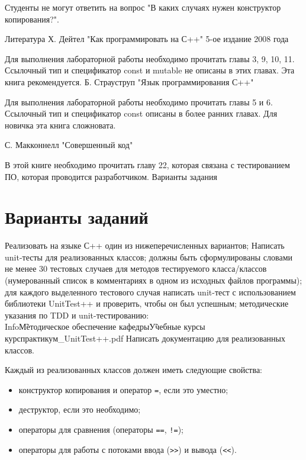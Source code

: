 \documentclass[a4paper,12pt]{article}
\begin{document}
Студенты не могут ответить на вопрос "В каких случаях нужен конструктор копирования?". 

Литература
Х. Дейтел "Как программировать на С++" 5-ое издание 2008 года

Для выполнения лабораторной работы необходимо прочитать главы 3, 9, 10, 11. Ссылочный тип и спецификатор const и mutable не описаны в этих главах. Эта книга рекомендуется.
Б. Страуструп "Язык программирования С++"

Для выполнения лабораторной работы необходимо прочитать главы 5 и 6. Ссылочный тип и спецификатор const описаны в более ранних главах. Для новичка эта книга сложновата.

С. Макконнелл "Совершенный код"

В этой книге необходимо прочитать главу 22, которая связана с тестированием ПО, которая проводится разработчиком.
Варианты задания


\section{Варианты заданий}
\label{sec:Tasks}

Реализовать на языке С++ один из нижеперечисленных вариантов;
Написать unit-тесты для реализованных классов;
должны быть сформулированы словами не менее 30 тестовых случаев для методов тестируемого класса/классов (нумерованный список в комментариях в одном из исходных файлов программы);
для каждого выделенного тестового случая написать unit-тест с использованием библиотеки UnitTest++ и проверить, чтобы он был успешным;
методические указания по TDD и unit-тестированию: \\Info\StudInfo\~Методическое обеспечение кафедры\~Учебные курсы\2 курс практикум\TDD_UnitTest++.pdf 
Написать документацию для реализованных классов. 

Каждый из реализованных классов должен иметь следующие свойства:

\begin{itemize}
\item конструктор копирования и оператор \lstinline|=|, если это
  уместно;
\item деструктор, если это необходимо;
\item операторы для сравнения (операторы \lstinline|==|,
  \lstinline|!=|);
\item операторы для работы с потоками ввода (\lstinline|>>|) и вывода
  (\lstinline|<<|).
\end{itemize}
\end{document}
